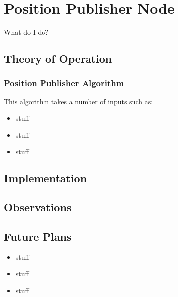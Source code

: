 \section{Position Publisher Node}

What do I do?

\subsection{Theory of Operation}


\subsubsection{Position Publisher Algorithm}
 This algorithm takes a number
of inputs such as:


\begin{itemize}
\item
  stuff
\item
  stuff
\item
  stuff
\end{itemize}


\subsection{Implementation}


\subsection{Observations}


\subsection{Future Plans}

\begin{itemize}
\item
  stuff
\item
  stuff
\item
  stuff
\end{itemize}
